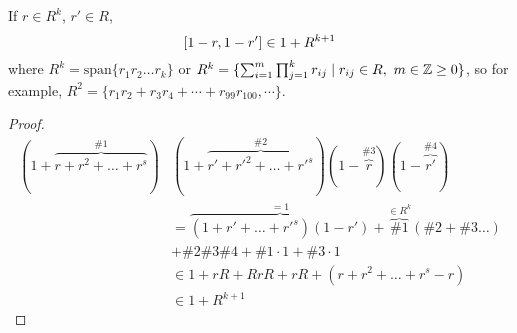 \documentclass[a4paper,twoside,master.tex]{subfiles}
\begin{document}
\begin{claim}
    If $ r \in R^k $, $ r' \in R $,
    \begin{equation}
        \comm{1-r}{1-r'} \in 1+R^{k+1}
    \end{equation}
    where $ R^k= \text{span} \{r_1r_2\ldots r_k\} $ or $ R^k = \{\sum_{i=1}^{m} \prod_{j=1}^{k} r_{ij} \mid r_{ij} \in R,\ m \in \mathbb{Z} \geq 0\} $, so for example, $ R^2 = \{r_1 r_2 + r_3 r_4 +\cdots + r_{99} r_{100}, \cdots\} $.
\end{claim}
\begin{proof}
    \begin{align}
        (1+\overbrace{r+r^2 +\ldots + r^s}^{\#1})&(1+\overbrace{r'+r'^2 + \ldots + r'^s}^{\#2})(1-\overbrace{r}^{\#3})(1-\overbrace{r'}^{\#4}) \\
        &= \overbrace{(1+r'+\ldots+r'^s)(1-r')}^{=1} +\overbrace{\#1}^{\in R^k} (\#2 + \#3 \ldots) \\
        &+ \#2\#3\#4 + \#1 \cdot 1 + \#3 \cdot 1\\
        &\in 1 + rR + RrR + rR + (r + r^2 + \ldots + r^s - r)\\
        &\in 1 + R^{k+1}
    \end{align}
\end{proof}
\end{document}
